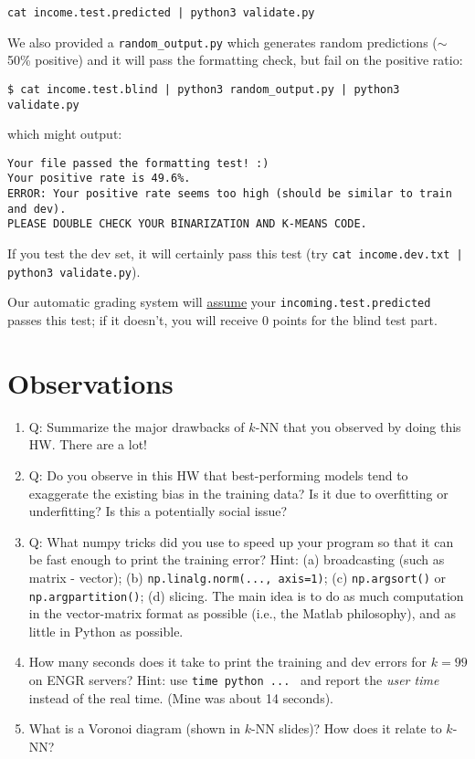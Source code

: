 \documentclass[11pt]{article}
\begin{document}
\verb#cat income.test.predicted | python3 validate.py#

We also provided a \verb|random_output.py| which generates random predictions ($\sim$50\% positive) and it will pass the formatting check, but fail on the positive ratio:

\verb#$ cat income.test.blind | python3 random_output.py | python3 validate.py#

which might output:
\begin{verbatim}
Your file passed the formatting test! :)
Your positive rate is 49.6%.
ERROR: Your positive rate seems too high (should be similar to train and dev).
PLEASE DOUBLE CHECK YOUR BINARIZATION AND K-MEANS CODE.
\end{verbatim}

If you test the dev set, it will certainly pass this test (try \verb#cat income.dev.txt | python3 validate.py#).

Our automatic grading system will \underline{assume} your \verb|incoming.test.predicted| passes this test; if it doesn't, you will receive 0 points for the blind test part.

\section{Observations}
\label{sec:obs}
\begin{enumerate}
\item
Q: Summarize the major drawbacks of $k$-NN that you observed by doing this HW. There are a lot!

\item
Q: Do you observe in this HW that best-performing models tend to exaggerate the existing bias in the training data? Is it due to overfitting or underfitting? Is this a potentially social issue?

\item \label{list:numpy}
Q: What numpy tricks did you use to speed up your program so that it can be fast enough to print the training error?  Hint: (a) broadcasting (such as matrix - vector);
(b) \verb|np.linalg.norm(..., axis=1)|;
 (c) \verb|np.argsort()| or \verb|np.argpartition()|; (d) slicing.
 The main idea is to do as much computation in the vector-matrix format as possible 
 (i.e., the Matlab philosophy),
 and as little in Python as possible.
 
 \item
 
 How many seconds does it take to print the training and dev errors for $k=99$ on ENGR servers?
 Hint: use \verb|time python ... | and report the {\em user time} instead of the real time. (Mine was about 14 seconds).

\item

What is a Voronoi diagram (shown in $k$-NN slides)? How does it relate to $k$-NN?

\end{enumerate}
\end{document}
